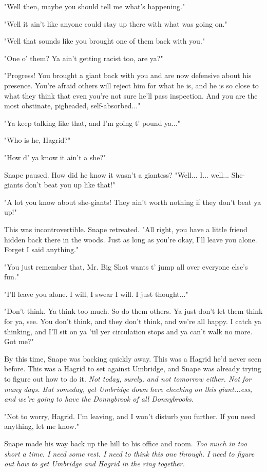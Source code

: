 "Well then, maybe you should tell me what's happening."

"Well it ain't like anyone could stay up there with what was going on."

"Well that sounds like you brought one of them back with you."

"One o' them? Ya ain't getting racist too, are ya?"

"Progress! You brought a giant back with you and are now defensive about his presence. You're afraid others will reject him for what he is, and he is so close to what they think that even you're not sure he'll pass inspection. And you are the most obstinate, pigheaded, self-absorbed..."

"Ya keep talking like that, and I'm going t' pound ya..."

"Who is he, Hagrid?"

"How d' ya know it ain't a she?"

Snape paused. How did he know it wasn't a giantess? "Well... I... well... She-giants don't beat you up like that!"

"A lot you know about she-giants! They ain't worth nothing if they don't beat ya up!"

This was incontrovertible. Snape retreated. "All right, you have a little friend hidden back there in the woods. Just as long as you're okay, I'll leave you alone. Forget I said anything."

"You just remember that, Mr. Big Shot wants t' jump all over everyone else's fun."

"I'll leave you alone. I will, I swear I will. I just thought..."

"Don't think. Ya think too much. So do them others. Ya just don't let them think for ya, see. You don't think, and they don't think, and we're all happy. I catch ya thinking, and I'll sit on ya 'til yer circulation stops and ya can't walk no more. Got me?"

By this time, Snape was backing quickly away. This was a Hagrid he'd never seen before. This was a Hagrid to set against Umbridge, and Snape was already trying to figure out how to do it. \emph{Not today, surely, and not tomorrow either. Not for many days. But someday, get Umbridge down here checking on this giant...ess, and we're going to have the Donnybrook of all Donnybrooks.}

"Not to worry, Hagrid. I'm leaving, and I won't disturb you further. If you need anything, let me know."

Snape made his way back up the hill to his office and room. \emph{Too much in too short a time. I need some rest. I need to think this one through. I need to figure out how to get Umbridge and Hagrid in the ring together.}

